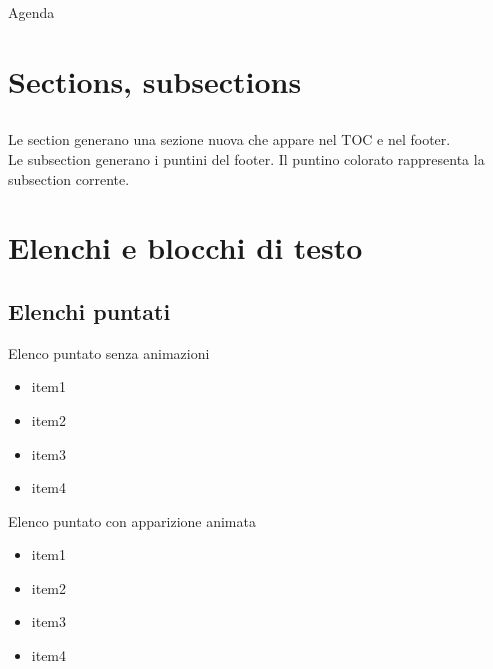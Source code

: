 \documentclass{beamer}
\begin{document}
\makeatletter
    \newenvironment{withoutfootline}{
        \setbeamertemplate{footline}[default]
        \def\beamer@entrycode{\vspace*{\footheight}}
    }{}
\makeatother


\AtBeginSection[] { 
  \begin{frame}
	\mysectionpage
  \end{frame} 
} 


\maketitle
\begin{frame}{Agenda}
   \tableofcontents
\end{frame}

\section{Sections, subsections}
\subsection{}
\begin{frame}
Le section generano una sezione nuova che appare nel TOC e nel footer.\\
Le subsection generano i puntini del footer. Il puntino colorato rappresenta la subsection corrente.
\end{frame}

\section{Elenchi e blocchi di testo}
\subsection{Elenchi puntati}
\begin{frame}{Elenco puntato senza animazioni}
\begin{itemize}
	\item item1
	\item item2
	\item item3
	\item item4
\end{itemize}
\end{frame}

\begin{frame}{Elenco puntato con apparizione animata}
\begin{itemize}
	\item<1-> item1
	\item<2-> item2
	\item<3-> item3
	\item<4-> item4
\end{itemize}
\end{frame}
\end{document}
